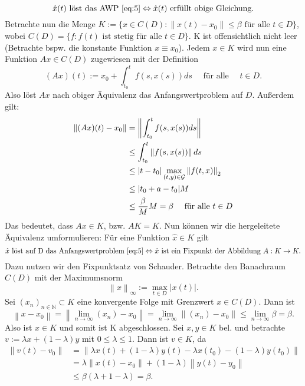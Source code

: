 \[
    \hat{x}(t) \text{ löst das AWP \eqref{eq:5}}  \Leftrightarrow \hat{x}(t) \text{ erfüllt obige Gleichung.}
\]
Betrachte nun die Menge $K := \{ x \in C(D): \left\lVert x(t) - x_0 \right\rVert \leq \beta \text{ für alle } t \in D \}$,
wobei $C(D)=\{f: f(t) \text{ ist stetig für alle } t \in D \}$. K ist offensichtlich nicht leer (Betrachte bspw. die
konstante Funktion $x \equiv x_0$). Jedem $x \in K$ wird nun eine Funktion $Ax \in C(D)$ zugewiesen mit der Definition
\[
    (Ax)(t) := x_0 + \int_{t_0}^{t} f(s, x(s)) ds \quad \text{ für alle } \quad t \in D.
\]
Also löst $Ax$ nach obiger Äquivalenz das Anfangswertproblem auf $D$. Außerdem gilt:
\begin{align*}
    \left\lVert (Ax)(t) - x_0 \right\rVert &= \left\lVert \int_{t_0}^{t} f(s, x(s)) ds \right\rVert \\
    &\leq \int_{t_0}^{t} \left\lVert f(s, x(s)) \right\rVert ds \\
    &\leq |t - t_0| \max_{(t,y)\in {\cal G}}\left\lVert f(t,x)\right\rVert_{2} \\
    &\leq |t_0 + a - t_0| M \\
    &\leq \frac{\beta}{M}M = \beta \quad \text{ für alle } t \in D
\end{align*}
Das bedeutet, dass $Ax \in K$, bzw. $AK = K$. Nun können wir die hergeleitete Äquivalenz umformulieren:
Für eine Funktion $\hat{x} \in K$ gilt
\[
    \hat{x} \text{ löst auf D das Anfangswertproblem } \eqref{eq:5} \Leftrightarrow \hat{x}
    \text{ ist ein Fixpunkt der Abbildung } A:K \rightarrow K.
\]
Dazu nutzen wir den Fixpunktsatz von Schauder. Betrachte den Banachraum $C(D)$ mit der Maximumsnorm
\[
    \left\lVert x \right\rVert_{\infty}:=\max_{t \in D} |x(t)|.
\]
Sei $(x_n)_{n \in \mathbb{N}} \subset K$ eine konvergente Folge mit Grenzwert $x \in C(D)$. Dann ist
\[
    \left\lVert x - x_0 \right\rVert = \left\lVert \lim_{n \rightarrow \infty}(x_n) - x_0 \right\rVert
    = \lim_{n \rightarrow \infty} \left\lVert (x_n) - x_0 \right\rVert \leq \lim_{n \rightarrow \infty} \beta = \beta.
\]
Also ist $x \in K$ und somit ist K abgeschlossen. Sei $x,y \in K $ bel. und betrachte $v:=\lambda x + (1-\lambda)y$
mit $0 \leq \lambda \leq 1$. Dann ist $v \in K$, da
\begin{align*}
    \left\lVert v(t) - v_0 \right\rVert
    &= \left\lVert \lambda x(t) + (1-\lambda)y(t) - \lambda x(t_0) - (1-\lambda)y(t_0) \right\rVert \\
    &= \lambda \left\lVert x(t) - x_0 \right\rVert + (1 - \lambda) \left\lVert y(t) - y_0 \right\rVert \\
    &\leq \beta (\lambda + 1 - \lambda) = \beta.
\end{align*}

